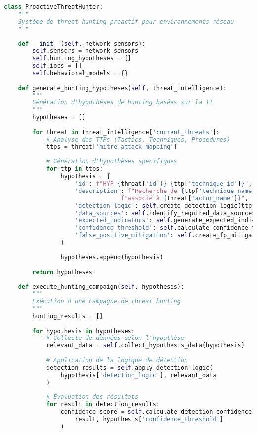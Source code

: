 \begin{lstlisting}[language=Python, caption=Système de threat hunting proactif]
class ProactiveThreatHunter:
    """
    Système de threat hunting proactif pour environnements réseau
    """
    
    def __init__(self, network_sensors):
        self.sensors = network_sensors
        self.hunting_hypotheses = []
        self.iocs = []
        self.behavioral_models = {}
        
    def generate_hunting_hypotheses(self, threat_intelligence):
        """
        Génération d'hypothèses de hunting basées sur la TI
        """
        hypotheses = []
        
        for threat in threat_intelligence['current_threats']:
            # Analyse des TTPs (Tactics, Techniques, Procedures)
            ttps = threat['mitre_attack_mapping']
            
            # Génération d'hypothèses spécifiques
            for ttp in ttps:
                hypothesis = {
                    'id': f"HYP-{threat['id']}-{ttp['technique_id']}",
                    'description': f"Recherche de {ttp['technique_name']} "
                                 f"associé à {threat['actor_name']}",
                    'detection_logic': self.create_detection_logic(ttp),
                    'data_sources': self.identify_required_data_sources(ttp),
                    'expected_indicators': self.generate_expected_indicators(ttp),
                    'confidence_threshold': self.calculate_confidence_threshold(ttp),
                    'false_positive_mitigation': self.create_fp_mitigation_strategy(ttp)
                }
                
                hypotheses.append(hypothesis)
                
        return hypotheses
    
    def execute_hunting_campaign(self, hypotheses):
        """
        Exécution d'une campagne de threat hunting
        """
        hunting_results = []
        
        for hypothesis in hypotheses:
            # Collecte de données selon l'hypothèse
            relevant_data = self.collect_hypothesis_data(hypothesis)
            
            # Application de la logique de détection
            detection_results = self.apply_detection_logic(
                hypothesis['detection_logic'], relevant_data
            )
            
            # Évaluation des résultats
            for result in detection_results:
                confidence_score = self.calculate_detection_confidence(
                    result, hypothesis['confidence_threshold']
                )
                

\end{lstlisting}
